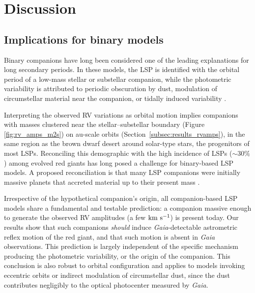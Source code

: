 \documentclass[trackchanges,twocolumn]{aastex631}
\begin{document}
\section{Discussion}\label{sec:discussion}

\subsection{Implications for binary models}\label{subsec:implications_for_binarity}

Binary companions have long been considered one of the leading explanations for long secondary periods. In these models, the LSP is identified with the orbital period of a low-mass stellar or substellar companion, while the photometric variability is attributed to periodic obscuration by dust, modulation of circumstellar material near the companion, or tidally induced variability \citep[e.g.,][]{Wood99,Wood04,Soszynski07,Soszynski14,Soszynski21,Percy23,Goldberg24,Decin25}. 

Interpreting the observed RV variations as orbital motion implies companions with masses clustered near the stellar--substellar boundary (Figure \ref{fig:rv_amps_m2s}) on au-scale orbits (Section~\ref{subsec:results_rvamps}), in the same region as the brown dwarf desert around solar-type stars, the progenitors of most LSPs.
Reconciling this demographic with the high incidence of LSPs ($\sim30\%$) among evolved red giants has long posed a challenge for binary-based LSP models. A proposed reconciliation is that many LSP companions were initially massive planets that accreted material up to their present mass \citep[e.g.,][]{Retter05,Soszynski21}. 

Irrespective of the hypothetical companion's origin, all companion-based LSP models share a fundamental and testable prediction: a companion massive enough to generate the observed RV amplitudes (a few ${\rm km~s^{-1}}$) is present today. Our results show that such companions {\it should} induce {\it Gaia}-detectable astrometric reflex motion of the red giant, and that such motion is absent in {\it Gaia} observations. 
This prediction is largely independent of the specific mechanism producing the photometric variability, or the origin of the companion.
This conclusion is also robust to orbital configuration and applies to models invoking eccentric orbits or indirect modulation of circumstellar dust, since the dust contributes negligibly to the optical photocenter measured by \textit{Gaia}.
\end{document}
